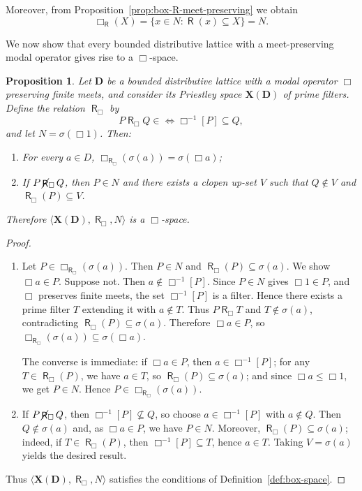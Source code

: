 \documentclass[10pt,a4paper]{amsart}
\newtheorem{proposition}[theorem]{Proposition}
\DeclareMathOperator{\R}{\mathsf{R}}
\DeclareMathOperator{\notR}{\cancel{ \R}}
\newcommand{\D}{\mathbf{D}}
\newcommand{\X}{\mathbf{X}}
\begin{document}
Moreover, from Proposition~\ref{prop:box-R-meet-preserving} we obtain
\[
\Box_{\R}(X) = \{x \in N : \R(x) \subseteq X\} = N.
\]

We now show that every bounded distributive lattice with a meet-preserving modal operator gives rise to a $\Box$-space.

\begin{proposition}
\label{prop:XD-box-space}
Let $\D$ be a bounded distributive lattice with a modal operator $\Box$ preserving finite meets, and consider its Priestley space $\X(\D)$ of prime filters. Define the relation $\R_\Box$ by
\[
P\R_\Box Q \in  \iff \Box^{-1}[P] \subseteq Q,
\]
and let $N = \sigma(\Box 1)$. Then:
\begin{enumerate}
    \item For every $a \in D$, $\Box_{\R_\Box}(\sigma(a)) = \sigma(\Box a)$;
    \item If $P\notR_\Box Q$, then $P \in N$ and there exists a clopen up-set $V$ such that $Q \notin V$ and $\R_\Box(P) \subseteq V$.
\end{enumerate}
Therefore $\langle \X(\D), \R_\Box, N \rangle$ is a $\Box$-space.
\end{proposition}
\begin{proof}
\begin{enumerate}
    \item Let $P \in \Box_{\R_\Box}(\sigma(a))$. Then $P \in N$ and $\R_\Box(P) \subseteq \sigma(a)$. We show $\Box a \in P$. Suppose not. Then $a \notin \Box^{-1}[P]$. Since $P \in N$ gives $\Box 1 \in P$, and $\Box$ preserves finite meets, the set $\Box^{-1}[P]$ is a filter. Hence there exists a prime filter $T$ extending it with $a \notin T$. Thus $P \R_\Box T$ and $T \notin \sigma(a)$, contradicting $\R_\Box(P) \subseteq \sigma(a)$. Therefore $\Box a \in P$, so $\Box_{\R_\Box}(\sigma(a)) \subseteq \sigma(\Box a)$.

    The converse is immediate: if $\Box a \in P$, then $a \in \Box^{-1}[P]$; for any $T \in \R_\Box(P)$, we have $a \in T$, so $\R_\Box(P) \subseteq \sigma(a)$; and since $\Box a \leq \Box 1$, we get $P \in N$. Hence $P \in \Box_{\R_\Box}(\sigma(a))$.

    \item If $P\notR_\Box Q$, then $\Box^{-1}[P] \not\subseteq Q$, so choose $a \in \Box^{-1}[P]$ with $a \notin Q$. Then $Q \notin \sigma(a)$ and, as $\Box a \in P$, we have $P \in N$. Moreover, $\R_\Box(P) \subseteq \sigma(a)$; indeed, if $T \in \R_\Box(P)$, then $\Box^{-1}[P] \subseteq T$, hence $a \in T$. Taking $V = \sigma(a)$ yields the desired result.
\end{enumerate}
Thus $\langle \X(\D), \R_\Box, N \rangle$ satisfies the conditions of Definition~\ref{def:box-space}.
\end{proof}
\end{document}
